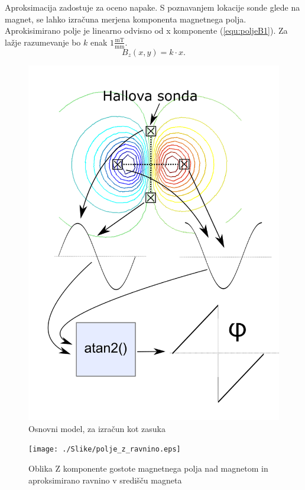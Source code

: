 Aproksimacija zadostuje za oceno napake. S poznavanjem lokacije sonde glede na magnet, se lahko izračuna merjena komponenta magnetnega polja. Aprokisimirano polje je linearno odvisno od x komponente (\ref{equ:poljeB1}).
Za lažje razumevanje bo $k$ enak $1\frac{\mathrm{mT}}{\mathrm{mm}}$.
\begin{equation}
\label{equ:poljeB1}
B_z(x,y)=k\cdot x.
\end{equation} 
\begin{figure}[ht]
	\centering
	\includegraphics[width=0.9\columnwidth]{./Slike/opis_modela.png}
	\caption{Osnovni model, za izračun kot zasuka}
	\label{opis_modela}
\end{figure}
\begin{figure}[ht]
	\centering
	\texttt{[image: ./Slike/polje\_z\_ravnino.eps]}
	\caption{Oblika Z komponente gostote magnetnega polja nad magnetom in aproksimirano ravnino v središču magneta}
	\label{polje_z_ravnino}
\end{figure}